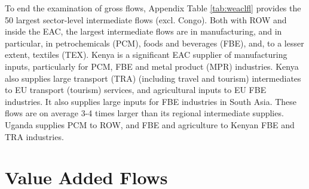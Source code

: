 \documentclass[a4paper]{article}
\begin{document}
%

To end the examination of gross flows, Appendix Table \ref{tab:weaclfl} provides the 50 largest sector-level intermediate flows (excl. Congo). Both with ROW and inside the EAC, the largest intermediate flows are in manufacturing, and in particular, in petrochemicals (PCM), foods and beverages (FBE), and, to a lesser extent, textiles (TEX). %
Kenya is a significant EAC supplier of manufacturing inputs, particularly for PCM, FBE and metal product (MPR) industries. Kenya also supplies large transport (TRA) (including travel and tourism) intermediates to EU transport (tourism) services, and agricultural inputs to EU FBE industries. It also supplies large inputs for FBE industries in South Asia. These flows are on average 3-4 times larger than its regional intermediate supplies. Uganda supplies PCM to ROW, and FBE and agriculture to Kenyan FBE and TRA industries. 


\section{Value Added Flows}
\end{document}
